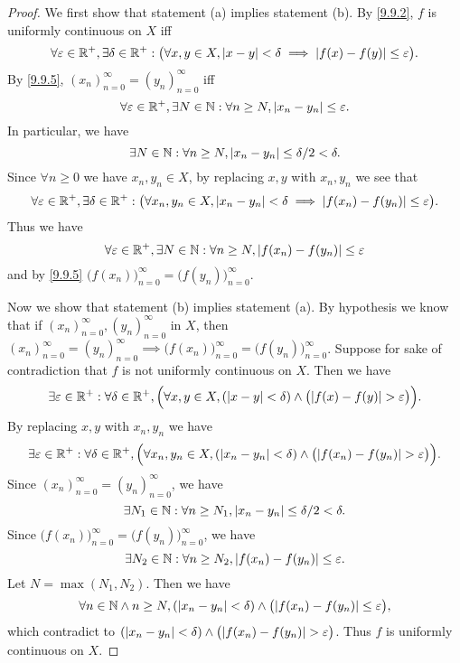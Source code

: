 \begin{proof}
  We first show that statement (a) implies statement (b).
  By \cref{9.9.2}, \(f\) is uniformly continuous on \(X\) iff
  \[
    \forall \varepsilon \in \mathbb{R}^+, \exists \delta \in \mathbb{R}^+ : \big(\forall x, y \in X, \left\lvert x - y\right\rvert < \delta \implies \left\lvert f(x) - f(y)\right\rvert \leq \varepsilon\big).
  \]
  By \cref{9.9.5}, \((x_n)_{n = 0}^\infty = (y_n)_{n = 0}^\infty\) iff
  \[
    \forall \varepsilon \in \mathbb{R}^+, \exists N \in \mathbb{N} : \forall n \geq N, \left\lvert x_n - y_n\right\rvert \leq \varepsilon.
  \]
  In particular, we have
  \[
    \exists N \in \mathbb{N} : \forall n \geq N, \left\lvert x_n - y_n\right\rvert \leq \delta / 2 < \delta.
  \]
  Since \(\forall n \geq 0\) we have \(x_n, y_n \in X\), by replacing \(x, y\) with \(x_n, y_n\) we see that
  \[
    \forall \varepsilon \in \mathbb{R}^+, \exists \delta \in \mathbb{R}^+ : \big(\forall x_n, y_n \in X, \left\lvert x_n - y_n\right\rvert < \delta \implies \left\lvert f(x_n) - f(y_n)\right\rvert \leq \varepsilon\big).
  \]
  Thus we have
  \[
    \forall \varepsilon \in \mathbb{R}^+, \exists N \in \mathbb{N} : \forall n \geq N, \left\lvert f(x_n) - f(y_n)\right\rvert \leq \varepsilon
  \]
  and by \cref{9.9.5} \(\big(f(x_n)\big)_{n = 0}^\infty = \big(f(y_n)\big)_{n = 0}^\infty\).

  Now we show that statement (b) implies statement (a).
  By hypothesis we know that if \((x_n)_{n = 0}^\infty, (y_n)_{n = 0}^\infty\) in \(X\), then \((x_n)_{n = 0}^\infty = (y_n)_{n = 0}^\infty \implies \big(f(x_n)\big)_{n = 0}^\infty = \big(f(y_n)\big)_{n = 0}^\infty\).
  Suppose for sake of contradiction that \(f\) is not uniformly continuous on \(X\).
  Then we have
  \[
    \exists \varepsilon \in \R^+ : \forall \delta \in \R^+, \Big(\forall x, y \in X, (\abs{x - y} < \delta) \land \big(\abs{f(x) - f(y)} > \varepsilon\big)\Big).
  \]
  By replacing \(x, y\) with \(x_n, y_n\) we have
  \[
    \exists \varepsilon \in \R^+ : \forall \delta \in \R^+, \Big(\forall x_n, y_n \in X, (\abs{x_n - y_n} < \delta) \land \big(\abs{f(x_n) - f(y_n)} > \varepsilon\big)\Big).
  \]
  Since \((x_n)_{n = 0}^\infty = (y_n)_{n = 0}^\infty\), we have
  \[
    \exists N_1 \in \mathbb{N} : \forall n \geq N_1, \left\lvert x_n - y_n\right\rvert \leq \delta / 2 < \delta.
  \]
  Since \(\big(f(x_n)\big)_{n = 0}^\infty = \big(f(y_n)\big)_{n = 0}^\infty\), we have
  \[
    \exists N_2 \in \mathbb{N} : \forall n \geq N_2, \left\lvert f(x_n) - f(y_n)\right\rvert \leq \varepsilon.
  \]
  Let \(N = \max(N_1, N_2)\).
  Then we have
  \[
    \forall n \in \N \land n \geq N, (\abs{x_n - y_n} < \delta) \land \big(\abs{f(x_n) - f(y_n)} \leq \varepsilon\big),
  \]
  which contradict to \((\abs{x_n - y_n} < \delta) \land \big(\abs{f(x_n) - f(y_n)} > \varepsilon\big)\).
  Thus \(f\) is uniformly continuous on \(X\).
\end{proof}

